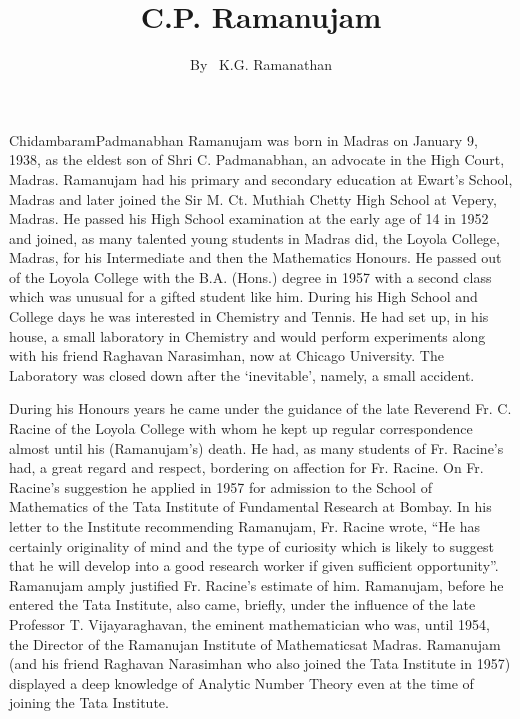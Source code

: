 \title{C.P. Ramanujam}

\author{By~ K.G. Ramanathan}

\date{}
\maketitle


\setcounter{page}{1}

Chidambaram\pageoriginale Padmanabhan Ramanujam was born in Madras on January 9, 
1938, as the eldest son of Shri C. Padmanabhan, an advocate in the 
High Court, Madras. Ramanujam had his primary and secondary education 
at Ewart's School, Madras and later joined the Sir M. Ct. Muthiah 
Chetty High School at Vepery, Madras. He passed his High School 
examination at the early age of 14 in 1952 and joined, as many 
talented young students in Madras did, the Loyola College, Madras, for 
his Intermediate and then the Mathematics Honours. He passed out of 
the Loyola College with the B.A. (Hons.) degree in 1957 with a second 
class which was unusual for a gifted student like him. During his High 
School and College days he was interested in Chemistry and Tennis. He 
had set up, in his house, a small laboratory in Chemistry and would 
perform experiments along with his friend Raghavan Narasimhan, now at 
Chicago University. The Laboratory was closed down after the 
`inevitable', namely, a small accident.

During his Honours years he came under the guidance of the late 
Reverend Fr. C. Racine of the Loyola College with whom he kept up 
regular correspondence almost until his (Ramanujam's) death. He had, 
as many students of Fr. Racine's had, a great regard and respect, 
bordering on affection for Fr. Racine. On Fr. Racine's suggestion he 
applied in 1957 for admission to the School of Mathematics of the Tata 
Institute of Fundamental Research at Bombay. In his letter to the 
Institute recommending Ramanujam, Fr. Racine wrote, ``He has certainly 
originality of mind and the type of curiosity which is likely to 
suggest that he will develop into a good research worker if given 
sufficient opportunity''. Ramanujam amply justified Fr. Racine's 
estimate of him. Ramanujam, before he entered the Tata Institute, also 
came, briefly, under the influence of the late Professor T. 
Vijayaraghavan, the eminent mathematician who was, until 1954, the 
Director of the Ramanujan Institute of Mathematics\pageoriginale at 
Madras. Ramanujam (and his friend Raghavan Narasimhan who also joined 
the Tata Institute in 1957) displayed a deep knowledge of Analytic 
Number Theory even at the time of joining the Tata Institute.

